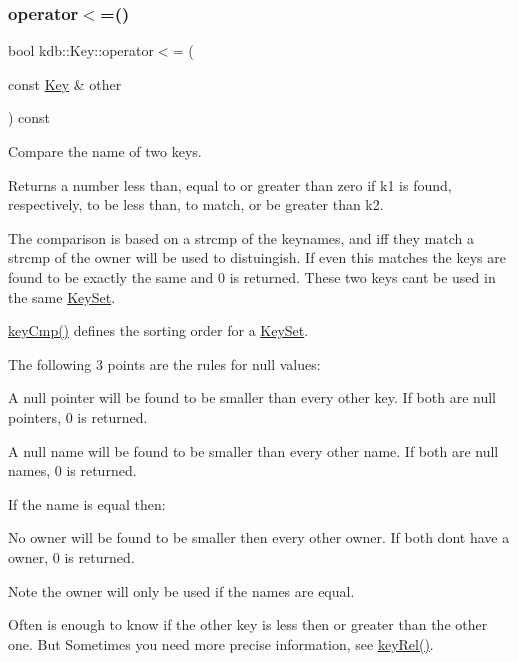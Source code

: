 \subsubsection{\texorpdfstring{operator$<$=()}{operator<=()}}
{\footnotesize\ttfamily bool kdb\+::\+Key\+::operator$<$= (\begin{DoxyParamCaption}\item[{const \hyperlink{classkdb_1_1Key}{Key} \&}]{other }\end{DoxyParamCaption}) const\hspace{0.3cm}{\ttfamily [inline]}}



Compare the name of two keys. 

\begin{DoxyReturn}{Returns}
a number less than, equal to or greater than zero if k1 is found, respectively, to be less than, to match, or be greater than k2.
\end{DoxyReturn}
The comparison is based on a strcmp of the keynames, and iff they match a strcmp of the owner will be used to distuingish. If even this matches the keys are found to be exactly the same and 0 is returned. These two keys can\textquotesingle{}t be used in the same \hyperlink{classkdb_1_1KeySet}{Key\+Set}.

\hyperlink{group__keytest_gaf6e66e12fe04d535a5d1c8218ced803e}{key\+Cmp()} defines the sorting order for a \hyperlink{classkdb_1_1KeySet}{Key\+Set}.

The following 3 points are the rules for null values\+:


\begin{DoxyItemize}
\item A null pointer will be found to be smaller than every other key. If both are null pointers, 0 is returned.
\item A null name will be found to be smaller than every other name. If both are null names, 0 is returned.
\end{DoxyItemize}

If the name is equal then\+:


\begin{DoxyItemize}
\item No owner will be found to be smaller then every other owner. If both don\textquotesingle{}t have a owner, 0 is returned.
\end{DoxyItemize}

\begin{DoxyNote}{Note}
the owner will only be used if the names are equal.
\end{DoxyNote}
Often is enough to know if the other key is less then or greater than the other one. But Sometimes you need more precise information, see \hyperlink{group__keytest_ga6bb0f95ac34ce9c42d61bb35a76139d0}{key\+Rel()}.

